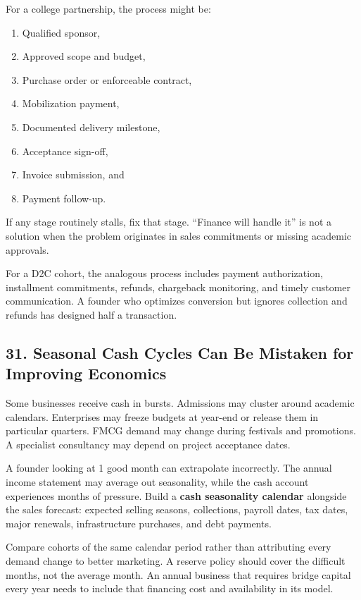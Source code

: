 For a college partnership, the process might be:
\begin{enumerate}
\item Qualified sponsor,
\item Approved scope and budget,
\item Purchase order or enforceable contract,
\item Mobilization payment,
\item Documented delivery milestone,
\item Acceptance sign-off,
\item Invoice submission, and
\item Payment follow-up.
\end{enumerate}
If any stage routinely stalls, fix that stage. ``Finance will handle it'' is not a solution when the problem originates in sales commitments or missing academic approvals.

For a D2C cohort, the analogous process includes payment authorization, installment commitments, refunds, chargeback monitoring, and timely customer communication. A founder who optimizes conversion but ignores collection and refunds has designed half a transaction.

\subsection*{31. Seasonal Cash Cycles Can Be Mistaken for Improving Economics}

Some businesses receive cash in bursts. Admissions may cluster around academic calendars. Enterprises may freeze budgets at year-end or release them in particular quarters. FMCG demand may change during festivals and promotions. A specialist consultancy may depend on project acceptance dates.

A founder looking at 1 good month can extrapolate incorrectly. The annual income statement may average out seasonality, while the cash account experiences months of pressure. Build a \textbf{cash seasonality calendar} alongside the sales forecast: expected selling seasons, collections, payroll dates, tax dates, major renewals, infrastructure purchases, and debt payments.

Compare cohorts of the same calendar period rather than attributing every demand change to better marketing. A reserve policy should cover the difficult months, not the average month. An annual business that requires bridge capital every year needs to include that financing cost and availability in its model.

